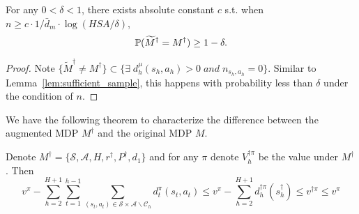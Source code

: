 \begin{lemma}\label{lem:tilde_equal_non}
	 For any $0<\delta<1$, there exists absolute constant $c$ s.t. when $n\geq c\cdot 1/\bar{d}_m \cdot\log(HSA/\delta)$,
	$$\P(\widetilde{M}^\dagger=M^\dagger)\geq 1-\delta.$$
\end{lemma}

\begin{proof}
	Note $\{\widetilde{M}^\dagger\neq M^\dagger\}\subset \{\exists\; d^\mu_h(s_h,a_h)>0\;and\;n_{s_h,a_h}=0 \}$. Similar to Lemma~\ref{lem:sufficient_sample}, this happens with probability less than $\delta$ under the condition of $n$.
\end{proof}

We have the following theorem to characterize the difference between the augmented MDP $M^\dagger$ and the original MDP $M$.
\begin{theorem}\label{thm:pess_discrepancy}
	Denote $M^\dagger=\{\mathcal{S},\mathcal{A}, H,r^\dagger,P^\dagger,d_1\}$ and for any $\pi$ denote $V^{\dagger\pi}_h$ be the value under $M^\dagger$. Then
	\begin{equation}
	v^\pi-\sum_{h=2}^{H+1}\sum_{t=1}^{h-1}\sum_{(s_t,a_t)\in\mathcal{S}\times\mathcal{A}\backslash \mathcal{C}_h}d^\pi_t(s_t,a_t)\leq v^\pi-\sum_{h=2}^{H+1}d^{\dagger\pi}_h(s^\dagger_h)\leq v^{\dagger\pi}\leq v^\pi
	\end{equation}
\end{theorem}


